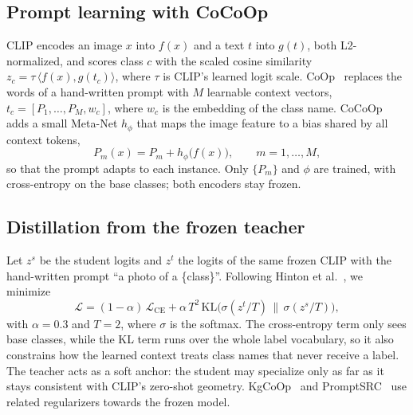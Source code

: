 \documentclass[10pt,twocolumn,a4paper]{article}
\begin{document}
\subsection{Prompt learning with CoCoOp}
CLIP encodes an image $x$ into $f(x)$ and a text $t$ into $g(t)$, both L2-normalized, and
scores class $c$ with the scaled cosine similarity $z_c = \tau\,\langle f(x), g(t_c)\rangle$,
where $\tau$ is CLIP's learned logit scale. CoOp~\cite{coop} replaces the words of a
hand-written prompt with $M$ learnable context vectors, $t_c = [P_1,\dots,P_M,w_c]$, where
$w_c$ is the embedding of the class name. CoCoOp~\cite{cocoop} adds a small Meta-Net
$h_\phi$ that maps the image feature to a bias shared by all context tokens,
\begin{equation}
  P_m(x) = P_m + h_\phi\big(f(x)\big), \qquad m = 1,\dots,M,
\end{equation}
so that the prompt adapts to each instance. Only $\{P_m\}$ and $\phi$ are trained, with
cross-entropy on the base classes; both encoders stay frozen.

\subsection{Distillation from the frozen teacher}
Let $z^{s}$ be the student logits and $z^{t}$ the logits of the same frozen CLIP with the
hand-written prompt ``a photo of a \{class\}''. Following Hinton et al.~\cite{kd}, we
minimize
\begin{equation}
  \mathcal{L} = (1-\alpha)\,\mathcal{L}_{\mathrm{CE}}
  + \alpha\,T^2\,\mathrm{KL}\big(\sigma(z^{t}/T)\,\|\,\sigma(z^{s}/T)\big),
\end{equation}
with $\alpha = 0.3$ and $T = 2$, where $\sigma$ is the softmax. The cross-entropy term
only sees base classes, while the KL term runs over the whole label vocabulary, so it also
constrains how the learned context treats class names that never receive a label. The
teacher acts as a soft anchor: the student may specialize only as far as it stays
consistent with CLIP's zero-shot geometry. KgCoOp~\cite{kgcoop} and
PromptSRC~\cite{promptsrc} use related regularizers towards the frozen model.
\end{document}
